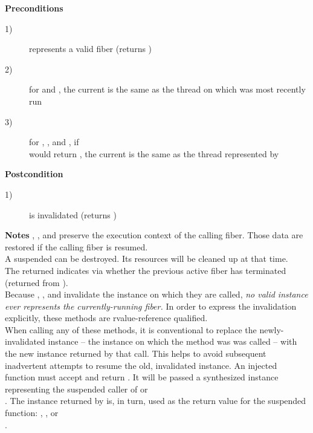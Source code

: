 {\bfseries Preconditions}
\begin{description}
    \item[1)]  represents a valid fiber (\opbool returns )
    \item[2)] for \resume and \resumewith, the current \thread is the same as
              the thread on which  was most recently run
    \item[3)] for \resume, \resumewith, \xtresume and \xtresumewith, if\\
              \usessysstack would return , the current \thread is
              the same as the thread represented by 
\end{description}

{\bfseries Postcondition}
\begin{description}
    \item[1)]  is invalidated (\opbool returns )
\end{description}

{\bfseries Notes}
\newline
\resume, \resumewith, \xtresume and \xtresumewith preserve the execution
context of the calling fiber. Those data are restored if the calling fiber is
resumed.\\
A suspended  can be destroyed. Its resources will be cleaned
up at that time.\\
The returned  indicates via \opbool whether the previous active
fiber has terminated (returned from \entryfn).\\
Because \resume, \resumewith, \xtresume and \xtresumewith invalidate the
instance on which they are called, \emph{no valid \fiber instance ever
represents the currently-running fiber.} In order to express the invalidation
explicitly, these methods are rvalue-reference qualified.\\
When calling any of these methods, it is conventional to replace the
newly-invalidated instance -- the instance on which the method was was called
-- with the new instance returned by that call. This helps to avoid subsequent
inadvertent attempts to resume the old, invalidated instance.
\newline
An injected function  must accept  and
return \fiber. It will be passed a synthesized \fiber instance representing
the suspended caller of \resumewith or\\
\xtresumewith. The \fiber instance returned by  is, in turn, used as
the return value for the suspended function: \resume, \resumewith, \xtresume
or\\\xtresumewith.

